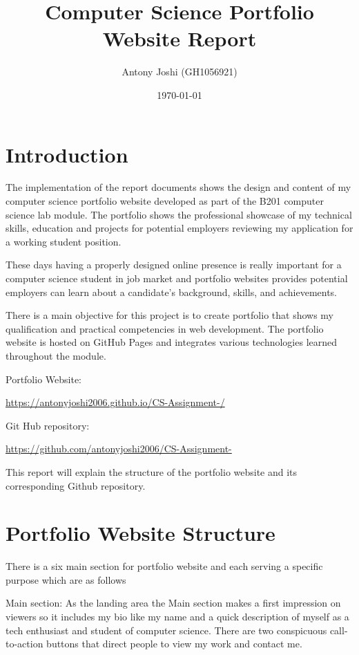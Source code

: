 \documentclass[12pt,a4paper]{article}
\title{Computer Science Portfolio Website Report}
\author{ Antony Joshi  (GH1056921)}
\date{\today}
\begin{document}
\maketitle
\tableofcontents
\newpage

\section{Introduction}

The implementation of the report documents shows the design and content of my computer science portfolio website developed as part of the B201 computer science lab module. The portfolio shows the professional showcase of my technical skills, education and projects for potential employers reviewing my application for a working student position.

These days having a properly designed online presence is really important for a computer science student in job market and portfolio websites provides potential employers can learn about a candidate's background, skills, and achievements.

There is a main objective for this project is to create portfolio that shows my qualification and practical competencies in web development. The portfolio website is hosted on GitHub Pages and integrates various technologies learned throughout the module.


Portfolio Website:

\url{https://antonyjoshi2006.github.io/CS-Assignment-/}

Git Hub repository:

\url{https://github.com/antonyjoshi2006/CS-Assignment-}

This report will explain the structure of the portfolio website and its corresponding Github repository.

\section{Portfolio Website Structure}

There is a six main section for portfolio website and each serving a specific purpose which are as follows

Main section: As the landing area the Main section makes a first impression on viewers so it includes my bio like my name and a quick description of myself as a tech enthusiast and student of computer science. There are two conspicuous call-to-action buttons that direct people to view my work and contact me.
\end{document}
